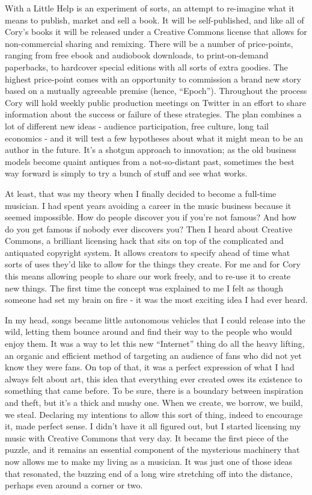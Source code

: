 With a Little Help is an experiment of sorts, an attempt to re-imagine 
what it means to publish, market and sell a book. It will be 
self-published, and like all of Cory's books it will be released under 
a Creative Commons license that allows for non-commercial sharing and 
remixing. There will be a number of price-points, ranging from free 
ebook and audiobook downloads, to print-on-demand paperbacks, to 
hardcover special editions with all sorts of extra goodies. The highest 
price-point comes with an opportunity to commission a brand new story 
based on a mutually agreeable premise (hence, “Epoch”). Throughout 
the process Cory will hold weekly public production meetings on Twitter 
in an effort to share information about the success or failure of these 
strategies. The plan combines a lot of different new ideas - audience 
participation, free culture, long tail economics - and it will test a 
few hypotheses about what it might mean to be an author in the future. 
It's a shotgun approach to innovation; as the old business models 
become quaint antiques from a not-so-distant past, sometimes the best 
way forward is simply to try a bunch of stuff and see what works.

At least, that was my theory when I finally decided to become a 
full-time musician. I had spent years avoiding a career in the music 
business because it seemed impossible. How do people discover you if 
you're not famous? And how do you get famous if nobody ever discovers 
you? Then I heard about Creative Commons, a brilliant licensing hack 
that sits on top of the complicated and antiquated copyright system. It 
allows creators to specify ahead of time what sorts of uses they'd like 
to allow for the things they create. For me and for Cory this means 
allowing people to share our work freely, and to re-use it to create 
new things. The first time the concept was explained to me I felt as 
though someone had set my brain on fire - it was the most exciting idea 
I had ever heard.

In my head, songs became little autonomous vehicles that I could 
release into the wild, letting them bounce around and find their way to 
the people who would enjoy them. It was a way to let this new 
“Internet” thing do all the heavy lifting, an organic and efficient 
method of targeting an audience of fans who did not yet know they were 
fans. On top of that, it was a perfect expression of what I had always 
felt about art, this idea that everything ever created owes its 
existence to something that came before. To be sure, there is a 
boundary between inspiration and theft, but it's a thick and mushy one. 
When we create, we borrow, we build, we steal. Declaring my intentions 
to allow this sort of thing, indeed to encourage it, made perfect 
sense. I didn't have it all figured out, but I started licensing my 
music with Creative Commons that very day. It became the first piece of 
the puzzle, and it remains an essential component of the mysterious 
machinery that now allows me to make my living as a musician. It was 
just one of those ideas that resonated, the buzzing end of a long wire 
stretching off into the distance, perhaps even around a corner or two.


